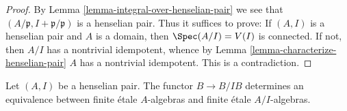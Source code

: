 \begin{proof}
By Lemma \ref{lemma-integral-over-henselian-pair} we see that
$(A/\mathfrak p, I + \mathfrak p/\mathfrak p)$ is a henselian pair.
Thus it suffices to prove: If $(A, I)$ is a henselian pair and
$A$ is a domain, then $\Spec(A/I) = V(I)$ is connected. If not,
then $A/I$ has a nontrivial idempotent, whence by
Lemma \ref{lemma-characterize-henselian-pair}
$A$ has a nontrivial idempotent. This is a contradiction.
\end{proof}

\begin{lemma}
\label{lemma-finite-etale-equivalence}
Let $(A, I)$ be a henselian pair. The functor $B \to B/IB$ determines
an equivalence between finite \'etale $A$-algebras and finite \'etale
$A/I$-algebras.
\end{lemma}

